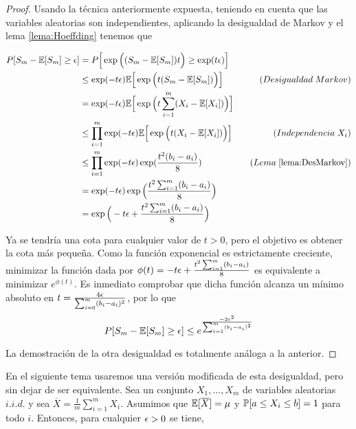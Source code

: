     \begin{proof}
        Usando la técnica anteriormente expuesta, teniendo en cuenta que las variables aleatorias son independientes, aplicando la desigualdad de Markov y el lema \ref{lema:Hoeffding} tenemos que
        
        \begin{equation}
            \begin{aligned}
                    P[S_m - \mathbb{E}[S_m] \geq \epsilon] & = P \Big[\exp\Big((S_m - \mathbb{E}[S_m])t\Big) \geq \exp(t \epsilon)\Big] \\
                    & \leq \exp(-t \epsilon) \mathbb{E}\Big[ \exp \Big(t (S_m - \mathbb{E}[S_m]) \Big) \Big] \quad & (Desigualdad \; Markov) \\
                    & = \exp(-t \epsilon) \mathbb{E}\Big[\exp \Big( t \sum_{i=1}^m(X_i - \mathbb{E}[X_i]) \Big) \Big] \\
                    & \leq \prod_{i=1}^m \exp(-t\epsilon) \mathbb{E}\Big[\exp \Big( t (X_i - \mathbb{E}[X_i]) \Big) \Big] \quad & (Independencia \; X_i)\\
                    & \leq \prod_{i=1}^m \exp(-t\epsilon) \exp( \frac{t^2 (b_i - a_i)}{8} ) \quad & (Lema \; \ref{lema:DesMarkov}) \\
                    & = \exp (-t\epsilon) \exp \Big( \frac{t^2 \sum_{i=1}^m(b_i - a_i)}{8} \Big) \\
                    & = \exp \Big( -t\epsilon + \frac{t^2 \sum_{i=1}^m(b_i - a_i)}{8} \Big)
            \end{aligned}
        \end{equation}
        
        Ya se tendría una cota para cualquier valor de $t>0$, pero el objetivo es obtener la cota más pequeña.
        Como la función exponencial es estrictamente creciente, minimizar la función dada por $\phi(t) = -t\epsilon + \frac{t^2 \sum_{i=1}^m(b_i - a_i)}{8}$ es equivalente a minimizar $e^{\phi(t)}$. Es inmediato comprobar que dicha función alcanza un mínimo absoluto en ${t=\frac{4\epsilon}{\sum_{i=0}^m(b_i-a_i)^2}}$, por lo que
        \begin{equation}
            P [S_m - \mathbb{E}[S_m] \geq \epsilon] \leq  e^{\frac{-2\epsilon^2}{\sum_{i=1}^m (b_i-a_i)^2}}
        \end{equation}
        
        \noindent La demostración de la otra desigualdad es totalmente análoga a la anterior. 
    \end{proof}
    
    En el siguiente tema usaremos una versión modificada de esta desigualdad, pero sin dejar de ser equivalente. Sea un conjunto $X_1,...,X_m$ de variables aleatorias $i.i.d.$ y sea $\overline{X} = \frac{1}{m} \sum_{i=1}^m X_i$. Asumimos que $\mathbb{E}[\overline{X}] = \mu$ y $\mathbb{P}[a \leq X_i \leq b] = 1$ para todo $i$. Entonces, para cualquier $\epsilon > 0$ se tiene,
    
